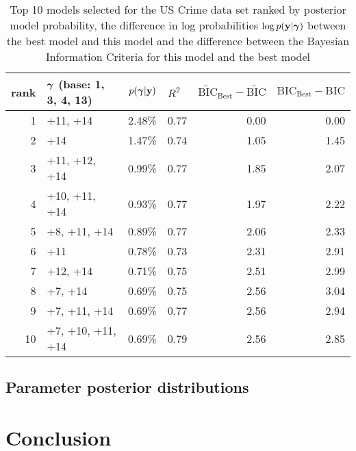 \documentclass{article}[12pt]
\begin{document}
\begin{table}
	\label{tab:numerical_results_uscrime}
	\caption{Top 10 models selected for the US Crime data set ranked by posterior model probability, the
		difference in log probabilities $\log p({\bf y}|{\boldsymbol \gamma})$ between the best model and this model and the difference between the Bayesian Information Criteria for this model and the best model}
	\begin{center}
		\begin{tabular}{r|l|r|l|r|r}
			rank & ${\boldsymbol \gamma}$ (base: 1, 3, 4, 13)& $p({\boldsymbol \gamma}|{\bf y})$ & $R^2$ & $\widetilde{\text{BIC}}_\text{Best} - \widetilde{\text{BIC}}$ & $\text{BIC}_\text{Best} - \text{BIC}$ \\
			\hline
			1 &  +11, +14&  2.48\%&  0.77&  0.00&  0.00\\
			2 & +14&  1.47\%&  0.74&  1.05&  1.45\\
			3 & +11, +12, +14&  0.99\%&  0.77&  1.85&  2.07\\
			4 & +10, +11, +14&  0.93\%&  0.77&  1.97&  2.22\\
			5 &  +8, +11, +14&  0.89\%&  0.77&  2.06&  2.33\\
			6 &  +11&  0.78\%&  0.73&  2.31&  2.91\\
			7 &  +12, +14&  0.71\%&  0.75&  2.51&  2.99\\
			8 &  +7, +14&  0.69\%&  0.75&  2.56&  3.04\\
			9 &  +7, +11, +14&  0.69\%&  0.77&  2.56&  2.94\\
			10 &  +7, +10, +11, +14&  0.69\%&  0.79&  2.56&  2.85\\
		\end{tabular}
	\end{center}
\end{table}


\subsection{Parameter posterior distributions}









\section{Conclusion}
\label{sec:conclusion}
\end{document}
